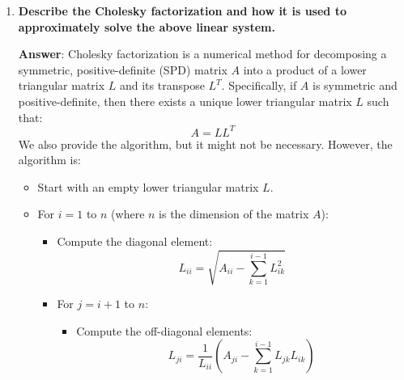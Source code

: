 \begin{enumerate}[label=\textcolor{Green3}{\textbf{\arabic*.}}]
    \newpage


    \item \textcolor{Green3}{\textbf{%
        Describe the Cholesky factorization and how it is used to approximately solve the above linear system.%
    }}

    \textbf{Answer}: Cholesky factorization is a numerical method for decomposing a symmetric, positive-definite (SPD) matrix $A$ into a product of a lower triangular matrix $L$ and its transpose $L^{T}$. Specifically, if $A$ is symmetric and positive-definite, then there exists a unique lower triangular matrix $L$ such that:
    \begin{equation*}
        A = LL^{T}
    \end{equation*}
    We also provide the algorithm, but it might not be necessary. However, the algorithm is:
    \begin{itemize}
        \item Start with an empty lower triangular matrix $L$.
        \item For $i = 1$ to $n$ (where $n$ is the dimension of the matrix $A$):
        \begin{itemize}
            \item Compute the diagonal element:
            \begin{equation*}
                L_{ii} = \sqrt{A_{ii} - \sum_{k=1}^{i-1} L_{ik}^2}
            \end{equation*}
            \item For $ j = i+1 $ to $ n $:
            \begin{itemize}
                \item Compute the off-diagonal elements:
                \begin{equation*}
                    L_{ji} = \frac{1}{L_{ii}} \left( A_{ji} - \sum_{k=1}^{i-1} L_{jk} L_{ik} \right)
                \end{equation*}
            \end{itemize}
        \end{itemize}
    \end{itemize}


\end{enumerate}
